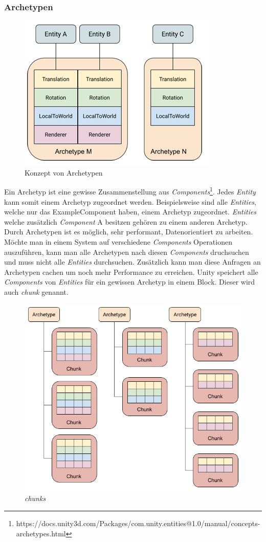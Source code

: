 \documentclass[12pt, titlepage]{article}
\DeclareRobustCommand{\#}{\adjustbox{valign=B,totalheight=.57\baselineskip}{\oldhash}}%
\begin{document}
\subsubsection{Archetypen}
\begin{figure}[H]
\includegraphics[scale=0.87]{Bilder/ArchetypeConcept.png}
\caption{Konzept von Archetypen}
\label{fig:archetype_concept}
\end{figure}
Ein Archetyp ist eine gewisse Zusammenstellung aus \textit{Components}\footnote{https://docs.unity3d.com/Packages/com.unity.entities@1.0/manual/concepts-archetypes.html}. Jedes \textit{Entity} kann somit einem Archetyp zugeordnet werden. Beispielsweise sind alle \textit{Entities}, welche nur das ExampleComponent haben, einem Archetyp zugeordnet. \textit{Entities} welche zusätzlich \textit{Component} A besitzen gehören zu einem anderen Archetyp. Durch Archetypen ist es möglich, sehr performant, Datenorientiert zu arbeiten. Möchte man in einem System auf verschiedene \textit{Components} Operationen auszuführen, kann man alle Archetypen nach diesen \textit{Components} druchsuchen und muss nicht alle \textit{Entities} durchsuchen. Zusätzlich kann man diese Anfragen an Archetypen cachen um noch mehr Performance zu erreichen. Unity speichert alle \textit{Components} von \textit{Entities} für ein gewissen Archetyp in einem Block. Dieser wird auch \textit{chunk} genannt.
\begin{figure}[H]
\includegraphics[scale=0.5]{Bilder/ArchetypeChunkDiagram.png}
\caption{\textit{chunks}}
\label{fig:archetyp_chunks}
\end{figure}
\end{document}
